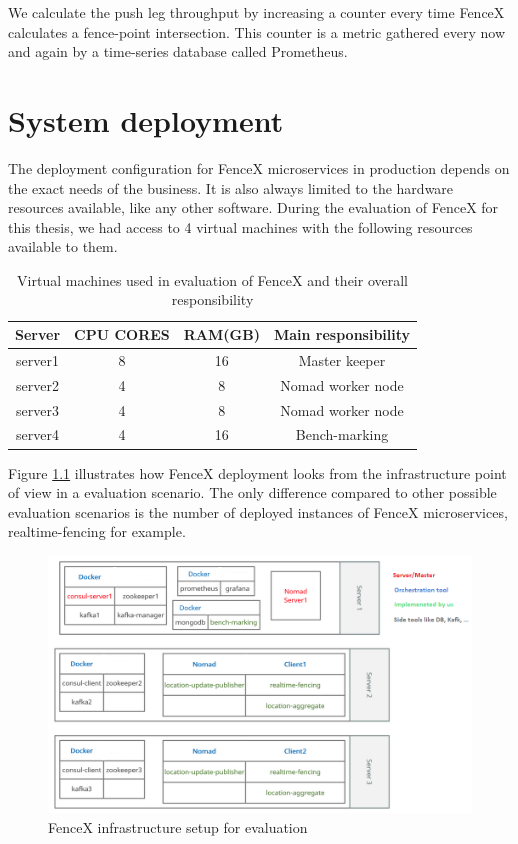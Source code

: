 \documentclass[a4]{report}
\begin{document}
    We calculate the push leg throughput by increasing a counter every time FenceX calculates a fence-point intersection.
    This counter is a metric gathered every now and again by a time-series database called Prometheus.


    \chapter{System deployment}
    The deployment configuration for FenceX microservices in production depends on the exact needs of the business.
    It is also always limited to the hardware resources available, like any other software.
    During the evaluation of FenceX for this thesis, we had access to 4 virtual machines with the following resources available to them.

    \begin{table}[h!]
        \centering
        \begin{tabular}{|c|c|c|c|}
            \hline
            Server  & CPU CORES & RAM(GB) & Main responsibility \\
            \hline
            server1 & 8         & 16      & Master keeper       \\
            server2 & 4         & 8       & Nomad worker node   \\
            server3 & 4         & 8       & Nomad worker node   \\
            server4 & 4         & 16      & Bench-marking       \\
            \hline
        \end{tabular}
        \caption{Virtual machines used in evaluation of FenceX and their overall responsibility}
        \label{table:vms}
    \end{table}

    Figure \ref{fig:infrastructure} illustrates how FenceX deployment looks from the infrastructure point of view in a
    evaluation scenario.
    The only difference compared to other possible evaluation scenarios is the number of deployed instances of FenceX
    microservices, realtime-fencing for example.

    \begin{figure}[h!]
        \centering
        \caption{FenceX infrastructure setup for evaluation}
        \label{fig:infrastructure}
        \includegraphics[scale=0.6]{images/Infrsutracture.png}
    \end{figure}
\end{document}

